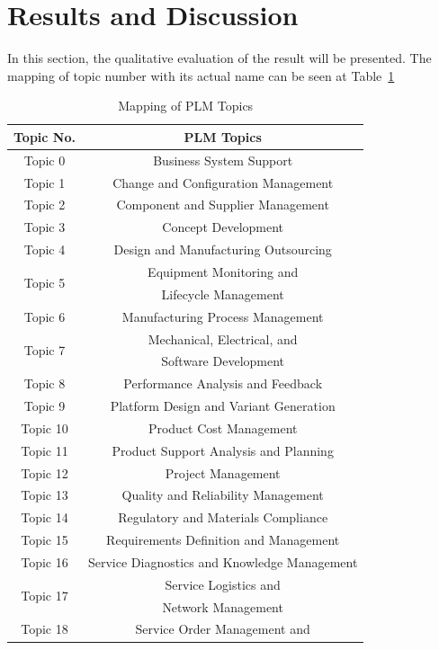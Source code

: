\documentclass[10pt, conference, compsocconf]{IEEEtran}
\begin{document}
\section{Results and Discussion}
In this section, the qualitative evaluation of the result will be presented. The mapping of topic number with its actual name can be seen at Table~\ref{table 5: mapping plm}
\begin{table}[ht]
\renewcommand{\arraystretch}{1.3}
\caption{Mapping of PLM Topics}
\label{table 5: mapping plm}
\centering
{\begin{tabular}{|c|c|}
\hline
\textbf{Topic No.}&\textbf{PLM Topics}\\
\hline
Topic 0&Business System Support  \\
\hline
Topic 1&Change and Configuration Management \\
\hline
Topic 2&Component and Supplier Management \\
\hline
Topic 3&Concept Development \\
\hline
Topic 4&Design and Manufacturing Outsourcing \\
\hline
\multirow{2}{*}{Topic 5}&Equipment Monitoring and\\
&Lifecycle Management \\
\hline
Topic 6&Manufacturing Process Management \\
\hline
\multirow{2}{*}{Topic 7}&Mechanical, Electrical, and \\
&Software Development \\
\hline
Topic 8&Performance Analysis and Feedback \\
\hline
Topic 9&Platform Design and Variant Generation \\
\hline
Topic 10&Product Cost Management \\
\hline
Topic 11&Product Support Analysis and Planning \\
\hline
Topic 12&Project Management \\
\hline
Topic 13&Quality and Reliability Management \\
\hline
Topic 14&Regulatory and Materials Compliance \\
\hline
Topic 15&Requirements Definition and Management \\
\hline
Topic 16&Service Diagnostics and Knowledge Management \\
\hline
\multirow{2}{*}{Topic 17}&Service Logistics and\\
&Network Management \\
\hline
\multirow{2}{*}{Topic 18}&Service Order Management and\\

\end{tabular}}
\end{table}
\end{document}
